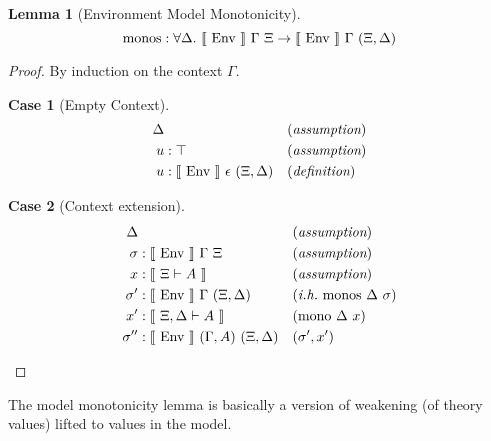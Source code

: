 \documentclass[preprint,nonatbib]{sigplanconf}
\numberwithin{subdefin}{defin}
\theoremstyle{definition}
\numberwithin{subtheorem}{theorem}
\numberwithin{sublemma}{theorem}
\numberwithin{corollary}{theorem}
\numberwithin{case}{theorem}
\numberwithin{slcase}{sublemma}
\numberwithin{scase}{subtheorem}
\newtheorem{lemma}{Lemma}
\newtheorem{lcase}{Case}
\numberwithin{lcase}{lemma}
\def\marr{\rightarrow}
\def\emp{\epsilon}
\def\mono{\fun{mono}}
\def\monos{\fun{monos}}
\def\bydef{(\textit{definition})}
\def\byass{(\textit{assumption})}
\newcommand{\ih}[1]{(\textit{i.h.}~ #1)}
\newcommand{\by}[1]{(#1)}
\newcommand{\all}[1]{\forall#1.~}
\newcommand{\el}[1]{\llbracket ~ #1 ~ \rrbracket}
\newcommand{\fun}[1]{\textmd{#1}}
\newcommand{\xtypm}[1]{\el{\Xi \vdash #1}}
\newcommand{\xdtypm}[1]{\el{\Xi, \Delta \vdash #1}}
\newcommand{\gmenv}[1]{\el{\fun{Env}}~\Gamma~#1}
\newcommand{\cmenv}[2]{\el{\fun{Env}}~#1~#2}
\begin{document}
\begin{lemma}[Environment Model Monotonicity]
\label{lem:mod:monos}
$$
\monos : \all{\Delta} \gmenv{\Xi} \marr \gmenv{(\Xi, \Delta)}
$$

\begin{proof}
By induction on the context $\Gamma$.

\begin{lcase}[Empty Context]
\begin{align*}
\Delta& && \byass\\
u &: \top && \byass\\
u &: \cmenv{\emp}{(\Xi, \Delta)} && \bydef
\end{align*}
\end{lcase}

\begin{lcase}[Context extension]
\begin{align*}
\Delta& && \byass\\
\sigma &: \gmenv{\Xi} && \byass\\
x    &: \xtypm{A} && \byass\\
\sigma'  &: \gmenv{(\Xi, \Delta)} && \ih{\monos~\Delta~\sigma}\\
x'   &: \xdtypm{A} && \by{\mono~\Delta~x}\\
\sigma'' &: \cmenv{(\Gamma, A)}{(\Xi, \Delta)} && \by{\sigma', x'}
\end{align*}
\end{lcase}

\end{proof}

\end{lemma}

The model monotonicity lemma is basically a version of weakening (of
theory values) lifted to values in the model. 
\end{document}
